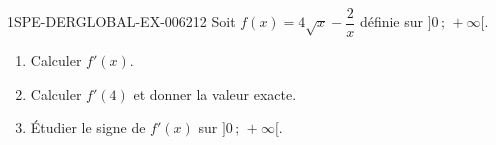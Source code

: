 \begin{exercice}{1SPE-DERGLOBAL-EX-006}{2}{12}
Soit $f(x) = 4\sqrt{x} - \dfrac{2}{x}$ définie sur $]0\,;\,+\infty[$.
\begin{enumerate}
  \item Calculer $f'(x)$.
  \item Calculer $f'(4)$ et donner la valeur exacte.
  \item Étudier le signe de $f'(x)$ sur $]0\,;\,+\infty[$.
\end{enumerate}
\end{exercice}

